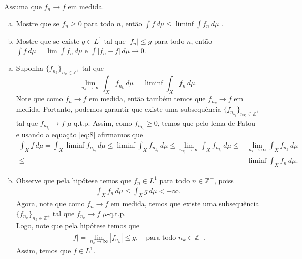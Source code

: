 \begin{homeworkProblem}[8]
  Assuma que $f_n\to f$ em medida.
  \begin{enumerate}[a)]
    \item Mostre que se $f_n\geq 0$ para todo $n$, então $\int f\,d\mu\leq \liminf\int f_n\,d\mu$ .
    \item Mostre que se existe $g\in L^{1}$ tal que $|f_n|\leq g$ para todo $n$, então $\int f\,d\mu=\lim\int f_n\,d\mu$ e $\int |f_n-f|\,d\mu\to 0$. 
  \end{enumerate}
  \begin{solution}
    \begin{enumerate}[a)]
      \item Suponha $\{f_{n_k}\}_{n_k\in\mathbb{Z}^{+}}$ tal que
        \begin{equation}\label{eq:8}
          \lim_{n_k\to\infty}\int_{X}f_{n_k}\,d\mu=\liminf\int_{X}f_{n}\,d\mu.
        \end{equation}
        Note que como $f_n\to f$ em medida, então também temos que $f_{n_k}\to f$ em medida. Portanto, podemos garantir que existe uma subsequência $\{f_{n_{k_i}}\}_{n_{k_i}\in\mathbb{Z}^{+}}$ tal que $f_{n_{k_i}}\to f$ $\mu$-q.t.p.
        Assim, como $f_{n_{k_i}}\geq 0$, temos que pelo lema de Fatou e usando a equação \eqref{eq:8} afirmamos que
        \begin{align*}
          \int_{X} f\,d\mu = \int_{X} \liminf f_{n_{k_i}}\,d\mu\leq \liminf \int_{X} f_{n_{k_i}}\,d\mu\leq\lim_{n_{k_i}\to\infty}\int_{X}f_{n_{k_i}}\,d\mu \leq& \lim_{n_{k}\to\infty}\int_{X}f_{n_{k}}\,d\mu\\
          \leq& \liminf  \int_{X}f_n\,d\mu.
        \end{align*}
      \item Observe que pela hipótese temos que $f_n\in L^{1}$ para todo $n\in\mathbb{Z}^{+}$, poiss
        \begin{align*}
          \int_{X}f_n\,d\mu\leq \int_{X}g\,d\mu<+\infty.
        \end{align*}
        Agora, note que como $f_n\to f$ em medida, temos que existe uma subsequência $\{f_{n_k}\}_{n_k\in\mathbb{Z}^{+}}$ tal que $f_{n_k}\to f$ $\mu$-q.t.p.\\
        Logo, note que pela hipótese temos que
        \begin{align*}
          |f|=\lim_{n_k \to \infty}|f_{n_k}|\leq g,\quad\text{para todo }n_k\in\mathbb{Z}^{+}.
        \end{align*}
        Assim, temos que $f\in L^{1}$.\\

\end{enumerate}
\end{solution}
\end{homeworkProblem}
